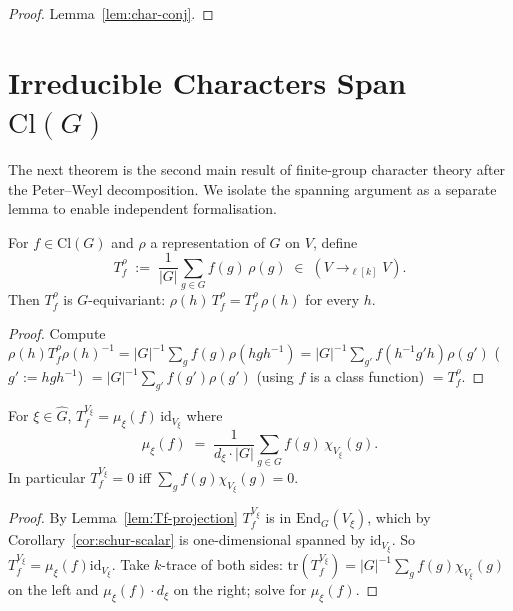 \begin{proof}
  \leanok
  Lemma~\ref{lem:char-conj}.
\end{proof}

\section{Irreducible Characters Span $\mathrm{Cl}(G)$}

The next theorem is the second main result of finite-group character theory
after the Peter–Weyl decomposition. We isolate the spanning argument as a
separate lemma to enable independent formalisation.

\begin{lemma}
  \label{lem:Tf-projection}
  For $f \in \mathrm{Cl}(G)$ and $\rho$ a representation of $G$ on $V$, define
  \[
    T_f^\rho \;:=\; \frac{1}{|G|}\sum_{g \in G} f(g)\,\rho(g) \;\in\;
    (V \to_{\!\ell[k]} V).
  \]
  Then $T_f^\rho$ is $G$-equivariant: $\rho(h)\, T_f^\rho = T_f^\rho\,\rho(h)$
  for every $h$.
\end{lemma}

\begin{proof}
  Compute $\rho(h) T_f^\rho \rho(h)^{-1} = |G|^{-1}\sum_g f(g)\rho(hgh^{-1})
  = |G|^{-1}\sum_{g'}f(h^{-1}g'h)\rho(g')$ ($g' := hgh^{-1}$)
  $= |G|^{-1}\sum_{g'}f(g')\rho(g')$ (using $f$ is a class function)
  $= T_f^\rho$.
\end{proof}

\begin{lemma}
  \label{lem:Tf-on-simple}
  For $\xi \in \hat G$, $T_f^{V_\xi} = \mu_\xi(f)\,\mathrm{id}_{V_\xi}$ where
  \[
    \mu_\xi(f) \;=\; \frac{1}{d_\xi \cdot |G|}\sum_{g \in G} f(g)\,\chi_{V_\xi}(g).
  \]
  In particular $T_f^{V_\xi} = 0$ iff $\sum_g f(g)\chi_{V_\xi}(g) = 0$.
\end{lemma}

\begin{proof}
  By Lemma~\ref{lem:Tf-projection} $T_f^{V_\xi}$ is in $\mathrm{End}_G(V_\xi)$,
  which by Corollary~\ref{cor:schur-scalar} is one-dimensional spanned by
  $\mathrm{id}_{V_\xi}$. So $T_f^{V_\xi} = \mu_\xi(f)\mathrm{id}_{V_\xi}$.
  Take $k$-trace of both sides:
  $\mathrm{tr}(T_f^{V_\xi}) = |G|^{-1}\sum_g f(g)\chi_{V_\xi}(g)$ on the left
  and $\mu_\xi(f)\cdot d_\xi$ on the right; solve for $\mu_\xi(f)$.
\end{proof}

